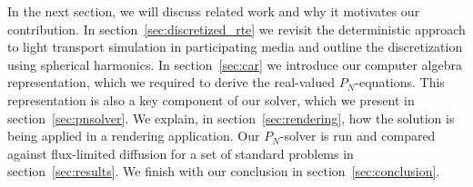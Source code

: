 In the next section, we will discuss related work and why it motivates our contribution. In section~\ref{sec:discretized_rte} we revisit the deterministic approach to light transport simulation in participating media and outline the discretization using spherical harmonics. In section~\ref{sec:car} we introduce our computer algebra representation, which we required to derive the real-valued $P_N$-equations. This representation is also a key component of our solver, which we present in section~\ref{sec:pnsolver}. We explain, in section~\ref{sec:rendering}, how the solution is being applied in a rendering application. Our $P_N$-solver is run and compared against flux-limited diffusion for a set of standard problems in section~\ref{sec:results}. We finish with our conclusion in section~\ref{sec:conclusion}.